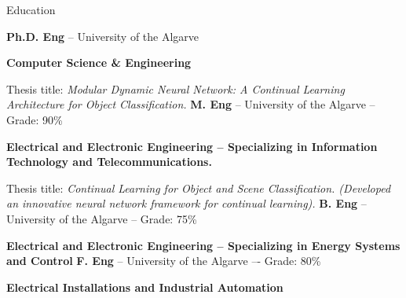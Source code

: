 \begin{rubric}{Education}


  \entry*[2021 -- Present]
  \textbf{Ph.D. Eng} -- University of the Algarve

  \vspace{0.1cm}
  \par \textbf{Computer Science \& Engineering}

  \par Thesis title: \emph{ Modular Dynamic Neural Network: A Continual Learning Architecture for Object
    Classification.}
  \vspace{0.15cm}
  \entry*[2018 -- 2020]
  \textbf{M. Eng} -- University of the Algarve -- Grade: 90\%

  \vspace{0.1cm}
  \par \textbf{Electrical and Electronic Engineering – Specializing in Information Technology and
    Telecommunications.}

  \par Thesis title: \emph{ Continual Learning for Object and Scene Classification. (Developed an innovative
    neural network framework for continual learning).}
  \vspace{0.15cm}
  \entry*[2015 -- 2018]
  \textbf{B. Eng} -- University of the Algarve -- Grade: 75\%

  \vspace{0.1cm}
  \par \textbf{Electrical and Electronic Engineering – Specializing in Energy Systems and Control}
  \vspace{0.15cm}
  \entry*[2013 -- 2015]
  \textbf{F. Eng} -- University of the Algarve –- Grade: 80\%

  \vspace{0.1cm}
  \par \textbf{Electrical Installations and Industrial Automation}
  \vspace{0.15cm}

\end{rubric}